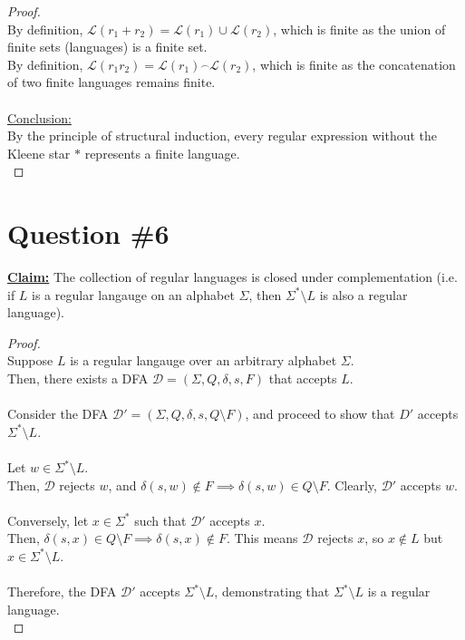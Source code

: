 \documentclass[12pt]{article}
\begin{document}
\begin{proof}
    \\
    By definition, \( \mathcal{L}(r_1 + r_2) = \mathcal{L}(r_1) \cup \mathcal{L}(r_2) \), which is finite as the union of finite sets (languages) is a finite set. \\
    By definition, \( \mathcal{L}(r_1 r_2) = \mathcal{L}(r_1) \overset{\frown}{\ } \mathcal{L}(r_2) \), which is finite as the concatenation of two finite languages remains finite. \\
    \\
    \underline{Conclusion:} \\
    By the principle of structural induction, every regular expression without the Kleene star \( * \) represents a finite language. \\
\end{proof}
\pagebreak

\section*{Question \#6}
\textbf{\underline{Claim:}} The collection of regular languages is closed under complementation (i.e. if \( L \) is a regular langauge on an alphabet \( \Sigma \), then \( \Sigma^* \setminus L \) is also a regular language).
\begin{proof}
\leavevmode\\
    Suppose \( L \) is a regular langauge over an arbitrary alphabet \( \Sigma \). \\
    Then, there exists a DFA \( \mathcal{D} = (\Sigma, Q, \delta, s, F) \) that accepts \( L \). \\
    \\
    Consider the DFA \( \mathcal{D}' = (\Sigma, Q, \delta, s, Q \setminus F) \), and proceed to show that \( D' \) accepts \( \Sigma^* \setminus L \). \\
    \\
    Let \( w \in \Sigma^* \setminus L \). \\
    Then, \( \mathcal{D} \) rejects \( w \), and \( \delta(s, w) \notin F \implies \delta(s, w) \in Q \setminus F \). Clearly, \( \mathcal{D}' \) accepts \( w \). \\
    \\
    Conversely, let \( x \in \Sigma^* \) such that \( \mathcal{D}' \) accepts \( x \). \\
    Then, \( \delta(s, x) \in Q \setminus F \implies \delta(s, x) \notin F \). This means \( \mathcal{D} \) rejects \( x \), so \( x \notin L \) but \( x \in \Sigma^* \setminus L \). \\
    \\
    Therefore, the DFA \( \mathcal{D}' \) accepts \( \Sigma^* \setminus L \), demonstrating that \( \Sigma^* \setminus L \) is a regular language. \\
\end{proof}
\pagebreak
\end{document}
